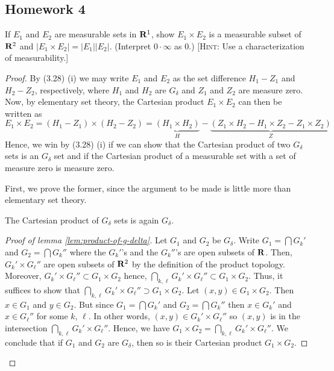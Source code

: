 \subsection{Homework 4}

\begin{problem}
If $E_1$ and $E_2$ are measurable sets in $\mathbf{R}^1$, show $E_1\times E_2$ is
a measurable subset of $\mathbf{R}^2$ and $\left|E_1\times
  E_2\right|=\left|E_1\right|\left|E_2\right|$. (Interpret $0\cdot\infty$
as $0$.) [\textsc{Hint:} Use a characterization of measurability.]
\end{problem}
\begin{proof}
By (3.28) (i) we may write $E_1$ and $E_2$ as the set difference $H_1\minus
Z_1$ and $H_2\minus Z_2$, respectively, where $H_1$ and $H_2$ are $G_\delta$
and $Z_1$ and $Z_2$ are measure zero. Now, by elementary set theory, the
Cartesian product $E_1\times E_2$ can then be written as
\begin{equation}
\label{eq:1}
E_1\times E_2
=\left(H_1\minus Z_1\right)\times\left(H_2\minus Z_2\right)
=\underbrace{\left(H_1\times H_2\right)}_H\minus
\underbrace{\left(Z_1\times H_2\minus H_1\times Z_2\minus Z_1\times Z_2\right)}_Z
\end{equation}
Hence, we win by (3.28) (i) if we can show that the Cartesian product of two
$G_\delta$ sets is an $G_\delta$ set and if the Cartesian product of a
measurable set with a set of measure zero is measure zero.

First, we prove the former, since the argument to be made is little more
than elementary set theory.
\begin{lemma}
\label{lem:product-of-g-delta}
The Cartesian product of $G_\delta$ sets is again $G_\delta$.
\end{lemma}
\begin{proof}[Proof of lemma \ref{lem:product-of-g-delta}]
\renewcommand\qedsymbol{$\clubsuit$}
Let $G_1$ and $G_2$ be $G_\delta$. Write
$G_1=\bigcap G_k'$ and $G_2=\bigcap G_k''$ where the $G_k'$'s and the
$G_k''$'s are open subsets of $\mathbf{R}$. Then, $G_k'\times G_\ell''$ are
open subsets of $\mathbf{R}^2$ by the definition of the product
topology. Moreover, $G_k'\times G_\ell''\subset G_1\times G_2$ hence,
$\bigcap_{k,\ell} G_k'\times G_\ell''\subset G_1\times G_2$. Thus, it
suffices to show that
$\bigcap_{k,\ell} G_k'\times G_\ell''\supset G_1\times G_2$. Let
$(x,y)\in G_1\times G_2$. Then $x\in G_1$ and $y\in G_2$. But since
$G_1=\bigcap G_k'$ and $G_2=\bigcap G_k''$ then $x\in G_k'$ and
$x\in G_\ell''$ for some $k$, $\ell$. In other words,
$(x,y)\in G_k'\times G_\ell''$ so $(x,y)$ is in the intersection
$\bigcap_{k,\ell}G_k'\times G_\ell''$. Hence, we have
$G_1\times G_2=\bigcap_{k,\ell} G_k'\times G_\ell''$. We conclude that if
$G_1$ and $G_2$ are $G_\delta$, then so is their Cartesian product
$G_1\times G_2$.
\end{proof}


\end{proof}
